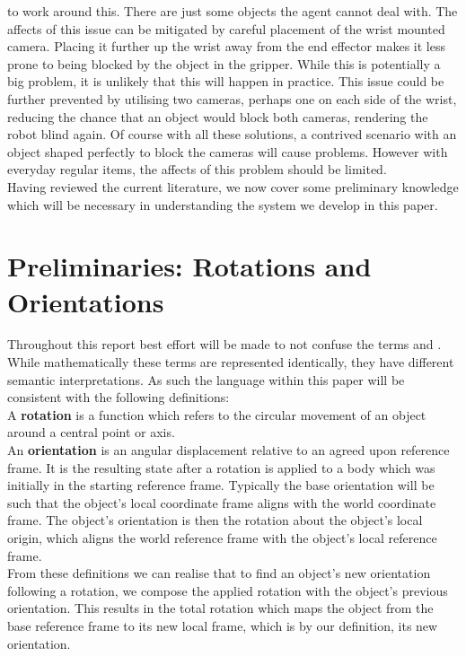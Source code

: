 to work around this. There are just some objects the agent cannot deal with. The affects of this issue can be mitigated by careful placement of the wrist mounted camera. Placing it further up the wrist away from the end effector makes it less prone to being blocked by the object in the gripper. While this is potentially a big problem, it is unlikely that this will happen in practice. This issue could be further prevented by utilising two cameras, perhaps one on each side of the wrist, reducing the chance that an object would block both cameras, rendering the robot blind again. Of course with all these solutions, a contrived scenario with an object shaped perfectly to block the cameras will cause problems. However with everyday regular items, the affects of this problem should be limited.\\

Having reviewed the current literature, we now cover some preliminary knowledge which will be necessary in understanding the system we develop in this paper.

\section{Preliminaries: Rotations and Orientations}
\label{sec:rotations}
Throughout this report best effort will be made to not confuse the terms  and . While mathematically these terms are represented identically, they have different semantic interpretations. As such the language within this paper will be consistent with the following definitions:\\
A \textbf{rotation} is a function which refers to the circular movement of an object around a central point or axis.\\ %
An \textbf{orientation} is an angular displacement relative to an agreed upon reference frame. It is the resulting state after a rotation is applied to a body which was initially in the starting reference frame. Typically the base orientation will be such that the object's local coordinate frame aligns with the world coordinate frame. The object's orientation is then the rotation about the object's local origin, which aligns the world reference frame with the object's local reference frame.\\

From these definitions we can realise that to find an object's new orientation following a rotation, we compose the applied rotation with the object's previous orientation. This results in the total rotation which maps the object from the base reference frame to its new local frame, which is by our definition, its new orientation.\\

